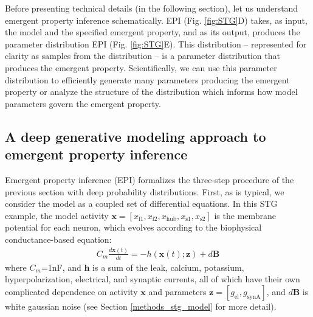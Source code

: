 \documentclass[11pt]{article}
\begin{document}
Before presenting technical details (in the following section), let us understand emergent property inference schematically.
EPI (Fig. \ref{fig:STG}D) takes, as input, the model and the specified emergent property, and as its output, produces the parameter distribution  EPI (Fig. \ref{fig:STG}E).  
This distribution -- represented for clarity as samples from the distribution -- is a parameter distribution that produces the emergent property. 
Scientifically, we can use this parameter distribution to efficiently generate many parameters producing the emergent property or analyze the structure of the distribution which informs how model parameters govern the emergent property.

\subsection{A deep generative modeling approach to emergent property inference} \label{results_dgm}
Emergent property inference (EPI) formalizes the three-step procedure of the previous section with deep probability distributions.
First, as is typical, we consider the model as a coupled set of differential equations.  
In this STG example, the model activity $\mathbf{x} = \left[ x_{\text{f1}}, x_{\text{f2}}, x_{\text{hub}}, x_{\text{s1}}, x_{\text{s2}} \right]$ is the membrane potential for each neuron, which evolves according to the biophysical conductance-based equation:
\begin{equation} 
\begin{split}
C_m \frac{d\mathbf{x}(t)}{dt} = -h(\mathbf{x}(t); \mathbf{z}) + d\mathbf{B}
 \end{split}
\end{equation} 
where $C_m$=1nF, and $\mathbf{h}$ is a sum of the leak, calcium, potassium, hyperpolarization, electrical, and synaptic currents, all of which have their own complicated dependence on activity $\mathbf{x}$ and parameters $\mathbf{z} = [g_{\text{el}}, g_{\text{synA}}]$, and $d\mathbf{B}$ is white gaussian noise \cite{morris1981voltage, gutierrez2013multiple} (see Section \ref{methods_stg_model} for more detail).
\end{document}
